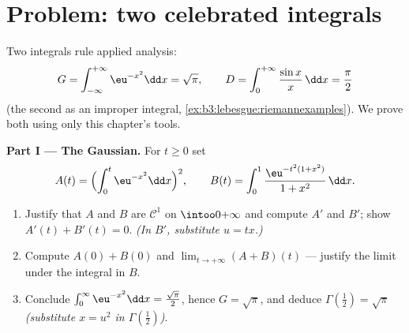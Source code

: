 \section{Problem: two celebrated integrals}

\begin{problem}
\label{pb:b3:lebesgue:1}
Two integrals rule applied analysis:
\[
G = \int_{-\infty}^{+\infty}\eu^{-x^2}\dd x = \sqrt\pi,
\qquad
D = \int_0^{+\infty}\frac{\sin x}{x}\,\dd x = \frac\pi2
\]
(the second as an improper integral,
\cref{ex:b3:lebesgue:riemannexamples}). We prove both using
only this chapter's tools.

\medskip
\noindent\textbf{Part I --- The Gaussian.} For $t \geq 0$ set
\[
A(t) = \Bigl(\int_0^t\eu^{-x^2}\dd x\Bigr)^{2},
\qquad
B(t) = \int_0^1\frac{\eu^{-t^2(1 + x^2)}}{1 + x^2}\,\dd x .
\]
\begin{enumerate}
  \item Justify that $A$ and $B$ are $\mathcal C^1$ on
        $\intoo0{+\infty}$ and compute $A'$ and $B'$; show
        $A'(t) + B'(t) = 0$. \emph{(In $B'$, substitute $u =
        tx$.)}
  \item Compute $A(0) + B(0)$ and $\lim_{t\to+\infty}(A + B)(t)$
        --- justify the limit under the integral in $B$.
  \item Conclude $\int_0^\infty \eu^{-x^2}\dd x =
        \frac{\sqrt\pi}2$, hence $G = \sqrt\pi$, and deduce
        $\Gamma(\tfrac12) = \sqrt\pi$ \emph{(substitute $x =
        u^2$ in $\Gamma(\frac12)$)}.
\end{enumerate}


\end{problem}
